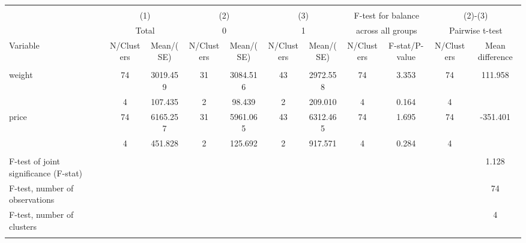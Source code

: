 
\begin{tabular}{@{\extracolsep{5pt}}lcccccccccc}
\\[-1.8ex]\hline \hline \\[-1.8ex]
 & \multicolumn{2}{c}{(1)}  & \multicolumn{2}{c}{(2)}  & \multicolumn{2}{c}{(3)}  & \multicolumn{2}{c}{F-test for balance} & \multicolumn{2}{c}{(2)-(3)} \\
 & \multicolumn{2}{c}{Total}  & \multicolumn{2}{c}{0}  & \multicolumn{2}{c}{1}  & \multicolumn{2}{c}{across all groups} & \multicolumn{2}{c}{Pairwise t-test}  \\
Variable & N/Clusters & Mean/(SE) & N/Clusters & Mean/(SE) & N/Clusters & Mean/(SE) & N/Clusters & F-stat/P-value & N/Clusters & Mean difference \\ \hline \\[-1.8ex] 
weight   & 74    &  3019.459    & 31    &  3084.516    & 43    &  2972.558    & 74    &     3.353    & 74    &   111.958   \\
 & 4  &   107.435  & 2  &    98.439  & 2  &   209.010  & 4  &     0.164  & 4  &   \\
price   & 74    &  6165.257    & 31    &  5961.065    & 43    &  6312.465    & 74    &     1.695    & 74    &  -351.401   \\
 & 4  &   451.828  & 2  &   125.692  & 2  &   917.571  & 4  &     0.284  & 4  &   \\
\hline \\[-1.8ex]
F-test of joint significance (F-stat) & &   & &   & &   & &     & &      1.128   \\
F-test, number of observations & &   & &   & &   & &   & &  74   \\
F-test, number of clusters & &   & &   & &   & &     & &  4   \\
\hline \\[-1.8ex]

\end{tabular}
